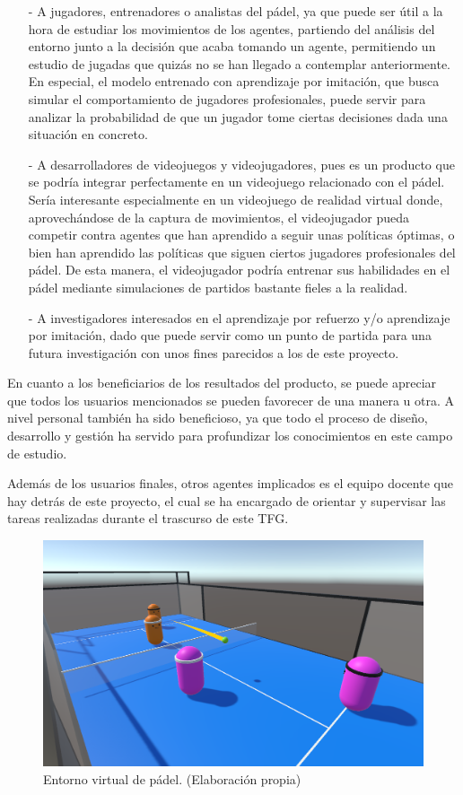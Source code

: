 \begin{itemize}
    \item[-] A jugadores, entrenadores o analistas del pádel, ya que puede ser útil a la hora de estudiar los movimientos de los agentes, partiendo del análisis del entorno  junto a la decisión que acaba tomando un agente, permitiendo un estudio de jugadas que quizás no se han llegado a contemplar anteriormente. En especial, el modelo entrenado con aprendizaje por imitación, que busca simular el comportamiento de jugadores profesionales, puede servir para analizar la probabilidad de que un jugador tome ciertas decisiones dada una situación en concreto.
    \item[-] A desarrolladores de videojuegos y videojugadores, pues es un producto que se podría integrar perfectamente en un videojuego relacionado con el pádel. Sería interesante especialmente en  un videojuego de realidad virtual donde, aprovechándose de la captura de movimientos, el videojugador pueda competir contra agentes que han aprendido a seguir unas políticas óptimas, o bien han aprendido las políticas que siguen ciertos jugadores profesionales del pádel. De esta manera, el videojugador podría entrenar sus habilidades en el pádel mediante simulaciones de partidos bastante fieles a la realidad.
    \item[-] A investigadores interesados en el aprendizaje por refuerzo y/o aprendizaje por imitación, dado que puede servir como un punto de partida para una futura investigación con unos fines parecidos a los de este proyecto.
\end{itemize}

En cuanto a los beneficiarios de los resultados del producto, se puede apreciar que todos los usuarios mencionados se pueden favorecer de una manera u otra. A nivel personal también ha sido beneficioso, ya que todo el proceso de diseño, desarrollo y gestión ha servido para profundizar los conocimientos en este campo de estudio.

Además de los usuarios finales, otros agentes implicados es el equipo docente que hay detrás de este proyecto, el cual se ha encargado de orientar y supervisar las tareas realizadas durante el trascurso de este TFG.

\begin{figure}[H]
    \centering
    \includegraphics[width=13cm]{figures/padel-in-game.png}
    \caption[Entorno virtual de pádel]{Entorno virtual de pádel. (Elaboración propia)}
\end{figure}